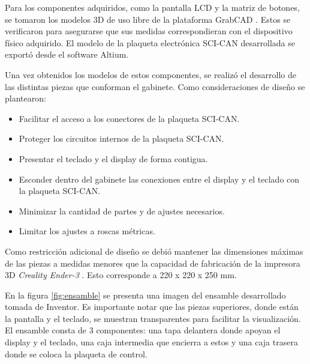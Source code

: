 Para los componentes adquiridos, como la pantalla LCD y la matriz de botones, se tomaron los modelos 3D de uso libre de la plataforma GrabCAD \citep{web_grabcad}. Estos se verificaron para asegurarse que sus medidas correspondieran con el dispositivo físico adquirido. El modelo de la plaqueta electrónica SCI-CAN desarrollada se exportó desde el software Altium.

Una vez obtenidos los modelos de estos componentes, se realizó el desarrollo de las distintas piezas que conforman el gabinete. Como consideraciones de diseño se plantearon:

\begin{itemize}
	\item Facilitar el acceso a los conectores de la plaqueta SCI-CAN.
	\item Proteger los circuitos internos de la plaqueta SCI-CAN.
	\item Presentar el teclado y el display de forma contigua.
	\item Esconder dentro del gabinete las conexiones entre el display y el teclado con la plaqueta SCI-CAN.
	\item Minimizar la cantidad de partes y de ajustes necesarios.
	\item Limitar los ajustes a roscas métricas.
\end{itemize}

Como restricción adicional de diseño se debió mantener las dimensiones máximas de las piezas a medidas menores que la capacidad de fabricación de la impresora 3D \textit{Creality Ender-3} \citep{web_ender3}. Esto corresponde a 220 x 220 x 250 mm.

En la figura \ref{fig:ensamble} se presenta una imagen del ensamble desarrollado tomada de Inventor. Es importante notar que las piezas superiores, donde están la pantalla y el teclado, se muestran transparentes para facilitar la visualización. El ensamble consta de 3 componentes: una tapa delantera donde apoyan el display y el teclado, una caja intermedia que encierra a estos y una caja trasera donde se coloca la plaqueta de control.

